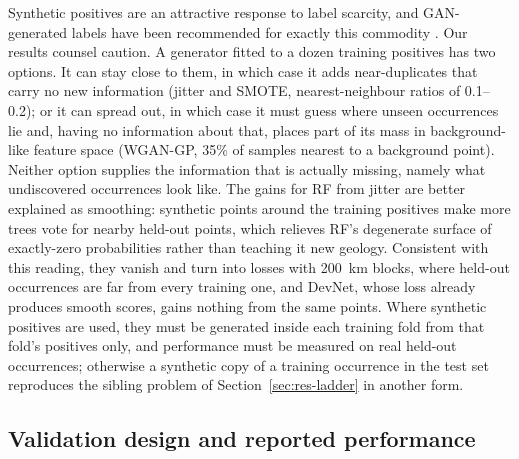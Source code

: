 \documentclass[pdflatex,sn-apa]{sn-jnl}
\begin{document}
Synthetic positives are an attractive response to label scarcity, and GAN-generated labels have been recommended for exactly this commodity \citep{Parsa2025}. Our results counsel caution. A generator fitted to a dozen training positives has two options. It can stay close to them, in which case it adds near-duplicates that carry no new information (jitter and SMOTE, nearest-neighbour ratios of 0.1--0.2); or it can spread out, in which case it must guess where unseen occurrences lie and, having no information about that, places part of its mass in background-like feature space (WGAN-GP, 35\% of samples nearest to a background point). Neither option supplies the information that is actually missing, namely what undiscovered occurrences look like. The gains for RF from jitter are better explained as smoothing: synthetic points around the training positives make more trees vote for nearby held-out points, which relieves RF's degenerate surface of exactly-zero probabilities rather than teaching it new geology. Consistent with this reading, they vanish and turn into losses with 200~km blocks, where held-out occurrences are far from every training one, and DevNet, whose loss already produces smooth scores, gains nothing from the same points. Where synthetic positives are used, they must be generated inside each training fold from that fold's positives only, and performance must be measured on real held-out occurrences; otherwise a synthetic copy of a training occurrence in the test set reproduces the sibling problem of Section~\ref{sec:res-ladder} in another form.

\subsection{Validation design and reported performance}\label{sec:disc-protocol}
\end{document}
